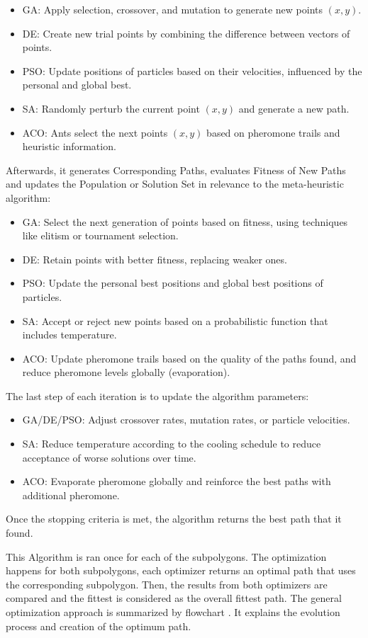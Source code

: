 \begin{itemize}
    \item GA: Apply selection, crossover, and mutation to generate new points $(x, y)$.
    \item DE: Create new trial points by combining the difference between vectors of points.
    \item PSO: Update positions of particles based on their velocities, influenced by the personal and global best.
    \item SA: Randomly perturb the current point $(x, y)$ and generate a new path.
    \item ACO: Ants select the next points $(x, y)$ based on pheromone trails and heuristic information.
\end{itemize}
Afterwards, it generates Corresponding Paths, evaluates Fitness of New Paths and updates the Population or Solution Set
in relevance to the meta-heuristic algorithm: 
\begin{itemize}
    \item GA: Select the next generation of points based on fitness, using techniques like elitism or tournament selection.
    \item DE: Retain points with better fitness, replacing weaker ones.
    \item PSO: Update the personal best positions and global best positions of particles.
    \item SA: Accept or reject new points based on a probabilistic function that includes temperature.
    \item ACO: Update pheromone trails based on the quality of the paths found, and reduce pheromone levels globally (evaporation).
\end{itemize}
The last step of each iteration is to update the algorithm parameters:
\begin{itemize}
    \item GA/DE/PSO: Adjust crossover rates, mutation rates, or particle velocities.
    \item SA: Reduce temperature according to the cooling schedule to reduce acceptance of worse solutions over time.
    \item ACO: Evaporate pheromone globally and reinforce the best paths with additional pheromone.
\end{itemize}
Once the stopping criteria is met, the algorithm returns the best path that it found.

This Algorithm is ran once for each of the subpolygons. The optimization happens for both subpolygons, each 
optimizer returns an optimal path that uses the corresponding subpolygon.
Then, the results from both optimizers are compared and the fittest is considered as the overall
fittest path. 
The general optimization approach is summarized by flowchart .
It explains the evolution process and creation of the optimum path.


